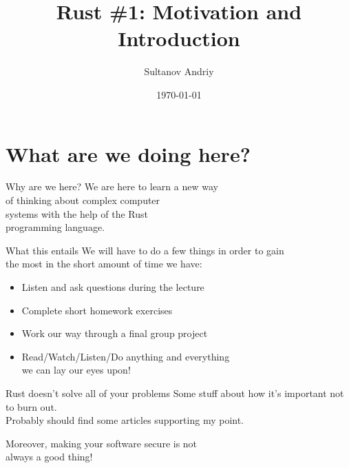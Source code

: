 \documentclass[usenames,dvipsnames,10pt,aspectratio=169]{beamer}
\title[Rust \#1]{Rust \#1: Motivation and Introduction}
\date[\today]{\small\today}
\author[Sultanov Andriy]{Sultanov Andriy}
\institute{APPS@UCU}
\begin{document}
\begin{frame}
\titlepage
\end{frame}

\begin{frame}{\contentsname}
\tableofcontents
\end{frame}


\section{What are we doing here?}

\begin{frame}{Why are we here?}
\Large	
We are here to learn a new way \\
of thinking about complex computer \\
systems with the help of the Rust \\
programming language.\\
\end{frame}

\begin{frame}{What this entails}
\large	
We will have to do a few things in order to gain\\
the most in the short amount of time we have:\\
\vspace{0.4cm}
\begin{itemize}[label=$\bullet$]
	\item Listen and ask questions during the lecture
	\item Complete short homework exercises
	\item Work our way through a final group project
	\item Read/Watch/Listen/Do anything and everything\\ 
		we can lay our eyes upon!
\end{itemize}
\end{frame}

\begin{frame}{Rust doesn't solve all of your problems}
	Some stuff about how it's important not to burn out.\\
	Probably should find some articles supporting my point.
	
	Moreover, making your software secure is not \\
	always a good thing!\\
\end{frame}
\end{document}
